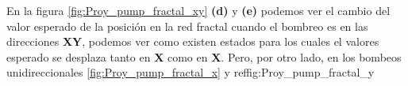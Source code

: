 En la figura \ref{fig:Proy_pump_fractal_xy} \textbf{(d)} y \textbf{(e)} podemos ver el cambio del valor esperado de la posición en la red fractal cuando el bombreo es en las direcciones \textbf{XY}, podemos ver como existen estados para los cuales el valores esperado se desplaza tanto en \textbf{X} como en \textbf{X}. Pero, por otro lado, en los bombeos unidireccionales \ref{fig:Proy_pump_fractal_x} y ref{fig:Proy_pump_fractal_y}





















